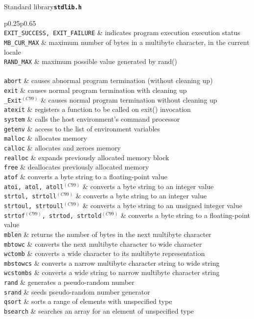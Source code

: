 \documentclass{article}
\newcommand{\newstd}{\ensuremath{^{(C99)}}\xspace}
\newcommand{\librarysection}[5]{{\vspace{2ex}\large #1\quad\textbf{\texttt{#2}}}\par\begin{supertabular}{p{#3\linewidth}p{#4\linewidth}}#5\end{supertabular}}
\newcommand{\funcdescription}[2]{\texttt{#1} & #2 \\}
\newcommand{\smallheader}[1]{\multicolumn{2}{c}{#1} \\}
\begin{document}
\begin{multicols*}{3}
\librarysection{Standard library}{stdlib.h}{0.25}{0.65}{
\smallheader{\underline{Macros}}
\funcdescription{EXIT\_SUCCESS, EXIT\_FAILURE}{indicates program execution execution status}
\funcdescription{MB\_CUR\_MAX}{maximum number of bytes in a multibyte character, in the current locale}
\funcdescription{RAND\_MAX}{maximum possible value generated by rand()}
\smallheader{\underline{Functions}}
\funcdescription{abort}{causes abnormal program termination (without cleaning up)}
\funcdescription{exit}{causes normal program termination with cleaning up}
\funcdescription{\_Exit\newstd}{causes normal program termination without cleaning up}
\funcdescription{atexit}{registers a function to be called on exit() invocation}
\funcdescription{system}{calls the host environment's command processor }
\funcdescription{getenv}{access to the list of environment variables}
\funcdescription{malloc}{allocates memory}
\funcdescription{calloc}{allocates and zeroes memory}
\funcdescription{realloc}{expands previously allocated memory block}
\funcdescription{free}{deallocates previously allocated memory}
\funcdescription{atof}{converts a byte string to a floating-point value}
\funcdescription{atoi, atol, atoll\newstd}{converts a byte string to an integer value}
\funcdescription{strtol, strtoll\newstd}{converts a byte string to an integer value}
\funcdescription{strtoul, strtoull\newstd}{converts a byte string to an unsigned integer value}
\funcdescription{strtof\newstd, strtod, strtold\newstd}{converts a byte string to a floating-point value }
\funcdescription{mblen}{returns the number of bytes in the next multibyte character}
\funcdescription{mbtowc}{converts the next multibyte character to wide character}
\funcdescription{wctomb}{converts a wide character to its multibyte representation}
\funcdescription{mbstowcs}{converts a narrow multibyte character string to wide string}
\funcdescription{wcstombs}{converts a wide string to narrow multibyte character string}
\funcdescription{rand}{generates a pseudo-random number}
\funcdescription{srand}{seeds pseudo-random number generator}
\funcdescription{qsort}{sorts a range of elements with unspecified type}
\funcdescription{bsearch}{searches an array for an element of unspecified type}
}


\end{multicols*}
\end{document}
